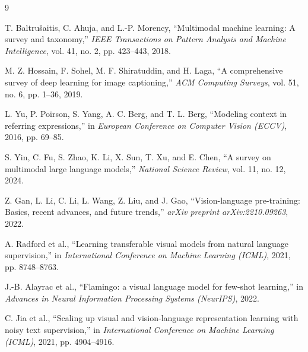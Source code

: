 \documentclass{article}
\begin{document}
\begin{thebibliography}{9}

T. Baltrušaitis, C. Ahuja, and L.-P. Morency,  
“Multimodal machine learning: A survey and taxonomy,”  
\emph{IEEE Transactions on Pattern Analysis and Machine Intelligence}, vol. 41, no. 2, pp. 423--443, 2018.

M. Z. Hossain, F. Sohel, M. F. Shiratuddin, and H. Laga,  
“A comprehensive survey of deep learning for image captioning,”  
\emph{ACM Computing Surveys}, vol. 51, no. 6, pp. 1--36, 2019.

L. Yu, P. Poirson, S. Yang, A. C. Berg, and T. L. Berg,  
“Modeling context in referring expressions,”  
in \emph{European Conference on Computer Vision (ECCV)}, 2016, pp. 69--85.

S. Yin, C. Fu, S. Zhao, K. Li, X. Sun, T. Xu, and E. Chen,  
“A survey on multimodal large language models,”  
\emph{National Science Review}, vol. 11, no. 12, 2024.

Z. Gan, L. Li, C. Li, L. Wang, Z. Liu, and J. Gao,  
“Vision-language pre-training: Basics, recent advances, and future trends,”  
\emph{arXiv preprint arXiv:2210.09263}, 2022.

A. Radford et al.,  
“Learning transferable visual models from natural language supervision,”  
in \emph{International Conference on Machine Learning (ICML)}, 2021, pp. 8748--8763.

J.-B. Alayrac et al.,  
“Flamingo: a visual language model for few-shot learning,”  
in \emph{Advances in Neural Information Processing Systems (NeurIPS)}, 2022.

C. Jia et al.,  
“Scaling up visual and vision-language representation learning with noisy text supervision,”  
in \emph{International Conference on Machine Learning (ICML)}, 2021, pp. 4904--4916.

\end{thebibliography}
\end{document}
